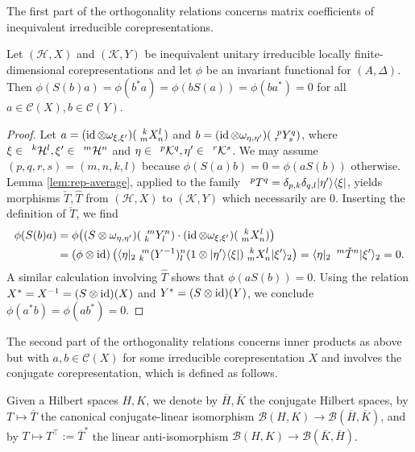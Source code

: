 The first part of the orthogonality relations concerns matrix
coefficients of inequivalent irreducible corepresentations.
\begin{Prop} \label{prop:rep-orthogonality-1}
  Let $(\mathcal{H},X)$ and $(\mathcal{K},Y)$ be inequivalent unitary
  irreducible locally finite-dimensional corepresentations and let
  $\phi$ be an invariant functional for $(A,\Delta)$.  Then
  $\phi(S(b)a) =\phi(b^{*}a) = \phi(bS(a))=\phi(ba^{*})=0$ for all
  $a\in \mathcal{C}(X), b \in \mathcal{C}(Y)$.
\end{Prop}
\begin{proof}
  Let $a=(\id \otimes \omega_{\xi,\xi'})(\Gr{X}{k}{l}{m}{n})$ and
  $b=(\id \otimes \omega_{\eta,\eta'})(\Gr{Y}{p}{q}{r}{s})$, where
  $\xi \in \Gru{\mathcal{H}}{k}{l}, \xi' \in \Gru{\mathcal{H}}{m}{n}$
  and $\eta \in \Gru{\mathcal{K}}{p}{q}, \eta' \in
  \Gru{\mathcal{K}}{r}{s}$. We may assume $(p,q,r,s) = (m,n,k,l)$
  because $\phi(S(a)b) = 0 = \phi(aS(b))$ otherwise.  
Lemma \ref{lem:rep-average}, applied to the 
  family $\Gru{T}{p}{q}= \delta_{p,k}\delta_{q,l}
  |\eta'\rangle\langle\xi|$, yields  morphisms $\check{T},\hat{T}$
  from $(\mathcal{H},X)$ to $(\mathcal{K},Y)$ which necessarily are
  $0$. Inserting the definition of $\check{T}$, we find
  \begin{align*}
    \phi(S(b)a) &= \phi\big((S \otimes
    \omega_{\eta,\eta'})(\Gr{Y}{m}{n}{k}{l}) \cdot (\id \otimes
    \omega_{\xi,\xi'})(\Gr{X}{k}{l}{m}{n})\big) \\ &= (\phi \otimes
    \id)\left(\langle\eta|_{2} \Gr{(Y^{-1})}{m}{n}{k}{l}(1 \otimes
      |\eta'\rangle\langle \xi|)
      \Gr{X}{k}{l}{m}{n}|\xi'\rangle_{2}\right) 
    = \langle \eta|_{2} \Gru{\check{T}}{m}{n}|\xi'\rangle_{2} = 0.
  \end{align*}
  A similar calculation involving $\hat{T}$ shows that
  $\phi(aS(b))=0$.  Using the relation $X^{*}=X^{-1}=(S\otimes
  \id)(X)$ and $Y^{*}=(S\otimes \id)(Y)$, we conclude
  $\phi(a^{*}b)=\phi(ab^{*})=0$.
\end{proof}

The second part of the orthogonality relations concerns inner products
as above but with $a,b\in \mathcal{C}(X)$ for some irreducible
corepresentation  $X$  and involves the conjugate corepresentation,
which is defined as follows.



Given a Hilbert spaces $H,K$, we denote by $\overline{H},\overline{K}$
the conjugate Hilbert spaces, by $T \mapsto \overline{T}$ the
canonical conjugate-linear isomorphism $\mathcal{B}(H,K) \to
\mathcal{B}(\overline{H},\overline{K})$, and by $T \mapsto
T^{\top}:=\overline{T}^{*}$ the linear anti-isomorphism
$\mathcal{B}(H,K) \to \mathcal{B}(\overline{K},\overline{H})$.

